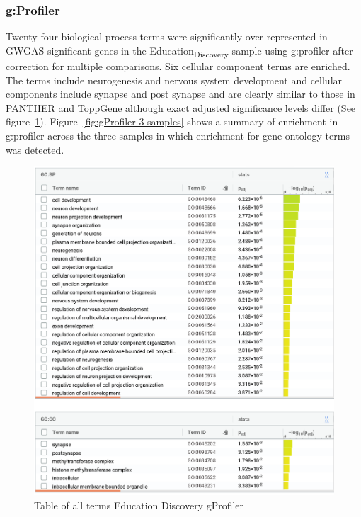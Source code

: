             \subsubsection{g:Profiler}
         Twenty four biological process terms were significantly over represented in GWGAS significant genes in the Education\textsubscript{Discovery} sample using g:profiler after correction for multiple comparisons. Six cellular component terms are enriched. The terms include neurogenesis and nervous system development and cellular components include synapse and post synapse and are clearly similar to those in PANTHER and ToppGene although exact adjusted significance levels differ (See figure~\ref{fig:table all terms Education Discovery gProfiler}). Figure~\ref{fig:gProfiler 3 samples} shows a summary of enrichment in g:profiler across the three samples in which enrichment for gene ontology terms was detected. 
        
            \begin{figure}
                \centering
                \includegraphics[width=\textwidth]{images/gprofiler/all_terms/ukbbed_allterms.png}
                \caption{Table of all terms Education Discovery gProfiler}
                \label{fig:table all terms Education Discovery gProfiler}
            \end{figure}

